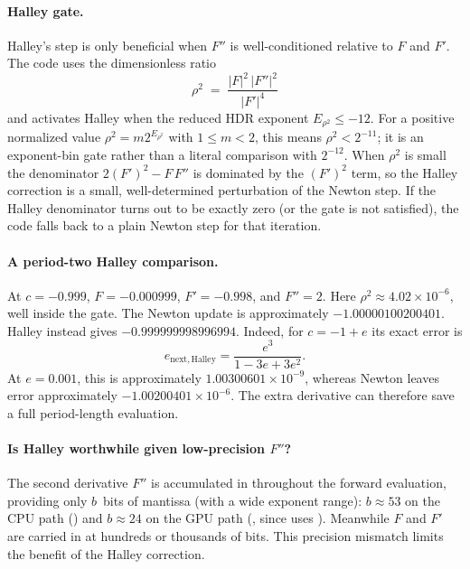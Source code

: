 \paragraph{Halley gate.}
Halley's step is only beneficial when $F''$ is well-conditioned relative to
$F$ and $F'$.  The code uses the dimensionless ratio
\begin{equation}\label{eq:ff-halley-gate}
\rho^2 \;=\;
  \frac{|F|^2\,|F''|^2}{|F'|^4}
\end{equation}
and activates Halley when the reduced HDR exponent
$E_{\rho^2}\le-12$.  For a positive normalized value
$\rho^2=m2^{E_{\rho^2}}$ with $1\le m<2$, this means
$\rho^2<2^{-11}$; it is an exponent-bin gate rather than a literal
comparison with $2^{-12}$.  When $\rho^2$ is
small the denominator $2(F')^2 - F\,F''$ is dominated by the $(F')^2$ term,
so the Halley correction is a small, well-determined perturbation of the
Newton step.  If the Halley denominator turns out to be exactly zero (or the
gate is not satisfied), the code falls back to a plain Newton step for that
iteration.

\paragraph{A period-two Halley comparison.}
At $c=-0.999$, $F=-0.000999$, $F'=-0.998$, and $F''=2$.
Here $\rho^2\approx4.02\times10^{-6}$, well inside the gate.
The Newton update is approximately $-1.00000100200401$.
Halley instead gives $-0.999999998996994$.
Indeed, for $c=-1+e$ its exact error is
\[
e_{\mathrm{next,Halley}}=\frac{e^3}{1-3e+3e^2}.
\]
At $e=0.001$, this is approximately $1.00300601\times10^{-9}$,
whereas Newton leaves error approximately $-1.00200401\times10^{-6}$.
The extra derivative can therefore save a full period-length evaluation.

\paragraph{Is Halley worthwhile given low-precision $F''$?}
The second derivative $F''$ is accumulated in 
throughout the forward evaluation, providing only $b$~bits of
mantissa (with a wide exponent range): $b \approx 53$ on the CPU path
() and $b \approx 24$ on the GPU path
(, since  uses
).  Meanwhile $F$ and $F'$ are carried in
 at hundreds or thousands of bits.  This precision mismatch
limits the benefit of the Halley correction.


